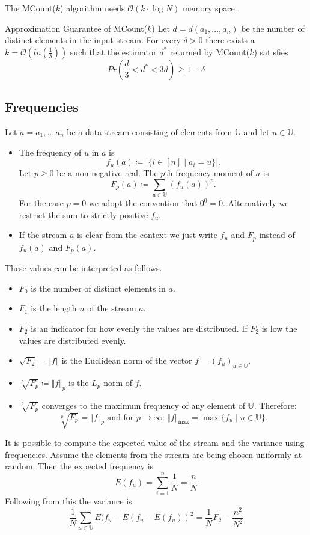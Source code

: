 \documentclass[english]{panikzettel}
\begin{document}
The MCount($k$) algorithm needs $\mathcal{O}(k\cdot \log N)$ memory space.

\begin{theo}{Approximation Guarantee of MCount($k$)}
Let $d=d(a_1,...,a_n)$ be the number of distinct elements in the input stream. For every $\delta > 0$ there exists a $k=\mathcal{O}(ln(\frac{1}{\delta}))$ such that the estimator $d^*$ returned by MCount($k$) satisfies
\[
Pr(\frac{d}{3}<d^* < 3d)\geq 1-\delta
\]
\end{theo}

\subsection{Frequencies}
Let $a=a_1,..,a_n$ be a data stream consisting of elements from $\mathbb{U}$ and let $u\in\mathbb{U}$.
\begin{itemize}
\item The frequency of $u$ in $a$ is
\[
f_u(a)\coloneqq  |\{i \in [n] \mid a_i=u \}|.
\]
Let $p\geq 0$ be a non-negative real. The $p$th frequency moment of $a$ is
\[
F_p(a)\coloneqq \sum_{u\in\mathbb{U}}(f_u(a))^p.
\]
For the case $p=0$ we adopt the convention that $0^0=0$. Alternatively we restrict the sum to strictly positive $f_u$.
\item If the stream $a$ is clear from the context we just write $f_u$ and $F_p$ instead of $f_u(a)$ and $F_p(a)$.
\end{itemize}
These values can be interpreted as follows.
\begin{itemize}
\item $F_0$ is the number of distinct elements in $a$.
\item $F_1$ is the length $n$ of the stream $a$.
\item $F_2$ is an indicator for how evenly the values are distributed. If $F_2$ is low the values are distributed evenly.
\item $\sqrt{F_2}=\Vert f\Vert$ is the Euclidean norm of the vector $f=(f_u)_{u\in \mathbb{U}}$.
\item $\sqrt[p]{F_p}\coloneqq\Vert f \Vert_p$ is the $L_p$-norm of $f$.
\item $\sqrt[p]{F_p}$ converges to the maximum frequency of any element of $\mathbb{U}$. Therefore:
\[
\sqrt[p]{F_p} = \Vert f\Vert_p \text{ and for } p\to \infty \text{: } \Vert f\Vert_{\max} = \max \{ f_u\mid u\in\mathbb{U} \}.
\]
\end{itemize}
It is possible to compute the expected value of the stream and the variance using frequencies. Assume the elements from the stream are being chosen uniformly at random. Then the expected frequency is
\[
E(f_u)=\sum_{i=1}^n\frac{1}{N}=\frac{n}{N}
\]
Following from this the variance is
\[
\frac{1}{N}\sum_{u\in\mathbb{U}}E(f_u-E(f_u-E(f_u))^2 = \frac{1}{N}F_2-\frac{n^2}{N^2}
\]
\end{document}
